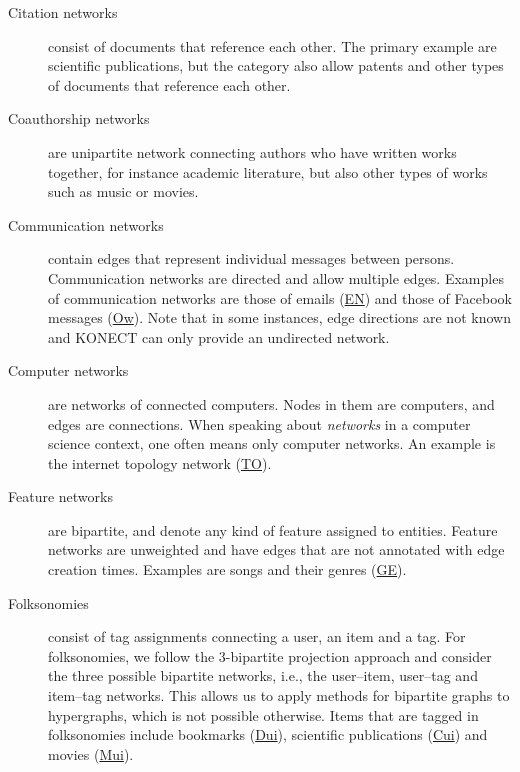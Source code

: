 \documentclass{article}
\begin{document}
\begin{description}
\item[Citation networks] consist of documents that reference each
  other.  The primary example are scientific publications, but the
  category also allow patents and other types of documents that
  reference each other. 

\item[Coauthorship networks] are unipartite network connecting authors
  who have written works together, for instance academic literature, but
  also other types of works such as music or movies. 

\item[Communication networks] contain edges that represent
  individual messages between persons.  Communication networks are directed
  and allow multiple edges.  
  Examples of communication networks are those of
  emails (\href{http://konect.uni-koblenz.de/networks/enron}{\textsf{EN}})
  and those of
  Facebook messages
  (\href{http://konect.uni-koblenz.de/networks/facebook-wosn-wall}{\textsf{Ow}}). Note
  that in some instances, edge directions are not 
  known and KONECT can only provide an undirected network. 

\item[Computer networks] are networks of connected computers. 
  Nodes in them are computers, and edges are connections. 
  When speaking about \emph{networks} in a computer science context, one
  often means only computer networks.  An example is the internet
  topology network (\href{http://konect.uni-koblenz.de/networks/topology}{\textsf{TO}}).

\item[Feature networks] are bipartite, and denote any kind of feature
  assigned to entities. Feature networks are unweighted and have
  edges that are not annotated with edge creation times.  Examples are
  songs and their genres
  (\href{http://konect.uni-koblenz.de/networks/dbpedia-genre}{\textsf{GE}}).   

\item[Folksonomies] consist of tag assignments connecting a user, an
  item and a tag.  For folksonomies, we follow the 3-bipartite
  projection approach and consider the three possible bipartite
  networks, i.e., the user--item, user--tag and item--tag networks.
  This allows us to apply methods for bipartite graphs to hypergraphs,
  which is not possible otherwise.  Items that are tagged in
  folksonomies include bookmarks
  (\href{http://konect.uni-koblenz.de/networks/delicious-ui}{\textsf{Dui}}),
  scientific publications
  (\href{http://konect.uni-koblenz.de/networks/citeulike-ui}{\textsf{Cui}})
  and movies
  (\href{http://konect.uni-koblenz.de/networks/movielens-10m_ui}{\textsf{Mui}}).


\end{description}
\end{document}

